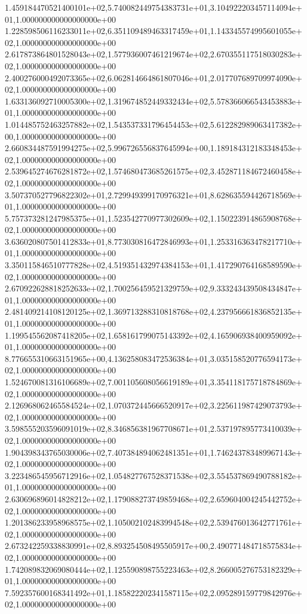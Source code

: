1.459184470521400101e+02,5.740082449754383731e+01,3.104922203457114094e+01,1.000000000000000000e+00
1.228598506116233011e+02,6.351109489463317459e+01,1.143345574995601055e+02,1.000000000000000000e+00
2.617873864801528043e+02,1.577936007461219674e+02,2.670355117518030283e+02,1.000000000000000000e+00
2.400276000492073365e+02,6.062814664861807046e+01,2.017707689709974090e+02,1.000000000000000000e+00
1.633136092710005300e+02,1.319674852449332434e+02,5.578366066543453883e+01,1.000000000000000000e+00
1.014485752463257882e+02,1.543537331796454453e+02,5.612282989063417382e+00,1.000000000000000000e+00
2.660834487591994275e+02,5.996726556837645994e+00,1.189184312183348453e+02,1.000000000000000000e+00
2.539645274676281872e+02,1.574680473685261575e+02,3.452871184672460458e+02,1.000000000000000000e+00
3.507370527796822302e+01,2.729949399170976321e+01,8.628635594426718569e+01,1.000000000000000000e+00
5.757373281247985375e+01,1.523542770977302609e+02,1.150223914865908768e+02,1.000000000000000000e+00
3.636020807501412833e+01,8.773030816472846993e+01,1.253316363478217710e+01,1.000000000000000000e+00
3.350115846510777828e+02,4.519351432974384153e+01,1.417290764168589590e+02,1.000000000000000000e+00
2.670922628818252633e+02,1.700256459521329759e+02,9.333243439508434847e+01,1.000000000000000000e+00
2.481409214108120125e+02,1.369713288310818768e+02,4.237956661836852135e+01,1.000000000000000000e+00
1.199545562087418205e+02,1.658161799075143392e+02,4.165906938400959092e+01,1.000000000000000000e+00
8.776655310663151965e+00,4.136258083472536384e+01,3.035158520776594173e+02,1.000000000000000000e+00
1.524670081316106689e+02,7.001105608056619189e+01,3.354118175718784869e+02,1.000000000000000000e+00
2.126968062465584524e+02,1.070372445666520917e+02,3.225611987429073793e+02,1.000000000000000000e+00
3.598555203596091019e+02,8.346856381967708671e+01,2.537197895773410039e+02,1.000000000000000000e+00
1.904398343765030006e+02,7.407384894062481351e+01,1.746243783489967143e+02,1.000000000000000000e+00
3.223486545956712916e+02,1.054827767528371538e+02,3.554537869490788182e+01,1.000000000000000000e+00
2.630696896014828212e+02,1.179088273749859468e+02,2.659604004245442752e+02,1.000000000000000000e+00
1.201386233958968575e+02,1.105002102483994548e+02,2.539476013642771761e+02,1.000000000000000000e+00
2.673242259338830991e+02,8.893254508495505917e+00,2.490771484718575834e+02,1.000000000000000000e+00
1.742089832069080444e+02,1.125590898755223463e+02,8.266005276753182329e+01,1.000000000000000000e+00
7.592357600168341492e+01,1.185822202341587115e+02,2.095289159779842976e+02,1.000000000000000000e+00
